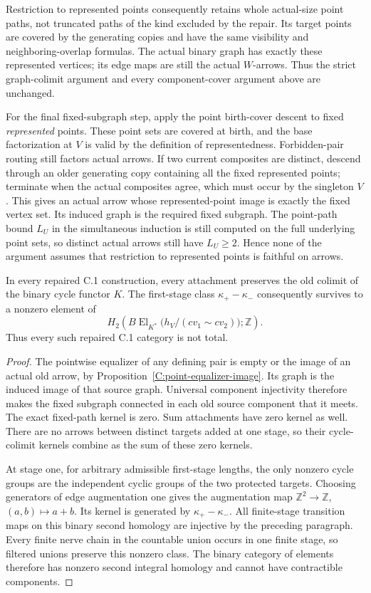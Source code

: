 Restriction to represented points consequently retains whole
actual-size point paths, not truncated paths of the kind excluded
by the repair. Its target points are covered by the generating
copies and have the same visibility and neighboring-overlap
formulas. The actual binary graph has exactly these represented
vertices; its edge maps are still the actual $W$-arrows. Thus the
strict graph-colimit argument and every component-cover argument
above are unchanged.

For the final fixed-subgraph step, apply the point birth-cover
descent to fixed \emph{represented} points. These point sets are
covered at birth, and the base factorization at $V$ is valid by
the definition of representedness. Forbidden-pair routing still
factors actual arrows. If two current composites are distinct,
descend through an older generating copy containing all the
fixed represented points; terminate when the actual composites
agree, which must occur by the singleton $V$. This gives an
actual arrow whose represented-point image is exactly the fixed
vertex set. Its induced graph is the required fixed subgraph.
The point-path bound $L_U$ in the simultaneous induction is still
computed on the full underlying point sets, so distinct actual
arrows still have $L_U\geq2$. Hence none of the argument assumes
that restriction to represented points is faithful on arrows.

\begin{corollary}
\label{C:universal-nontotal-draft}
In every repaired C.1 construction, every attachment preserves
the old colimit of the binary cycle functor $K$. The first-stage
class $\kappa_+-\kappa_-$ consequently survives to a nonzero
element of
\[
 H_2\!\left(B\operatorname{El}_{K^*}
    \bigl(h_V/(cv_1\sim cv_2)\bigr);\mathbb Z\right).
\]
Thus every such repaired C.1 category is not total.
\end{corollary}

\begin{proof}
The pointwise equalizer of any defining pair is empty or the
image of an actual old arrow, by
Proposition~\ref{C:point-equalizer-image}. Its graph is the
induced image of that source graph. Universal component
injectivity therefore makes the fixed subgraph connected in
each old source component that it meets. The exact fixed-path
kernel is zero. Sum attachments have zero kernel as well.
There are no arrows between distinct targets added at one stage,
so their cycle-colimit kernels combine as the sum of these zero
kernels.

At stage one, for arbitrary admissible first-stage lengths, the
only nonzero cycle groups are the independent cyclic groups
of the two protected targets. Choosing generators of edge
augmentation one gives the augmentation map
$\mathbb Z^2\to\mathbb Z$, $(a,b)\mapsto a+b$. Its kernel is
generated by $\kappa_+-\kappa_-$. All finite-stage transition
maps on this binary second homology are injective by the preceding
paragraph. Every finite nerve chain in the countable union
occurs in one finite stage, so filtered unions preserve this
nonzero class. The binary category of elements therefore has
nonzero second integral homology and cannot have contractible
components.
\end{proof}
